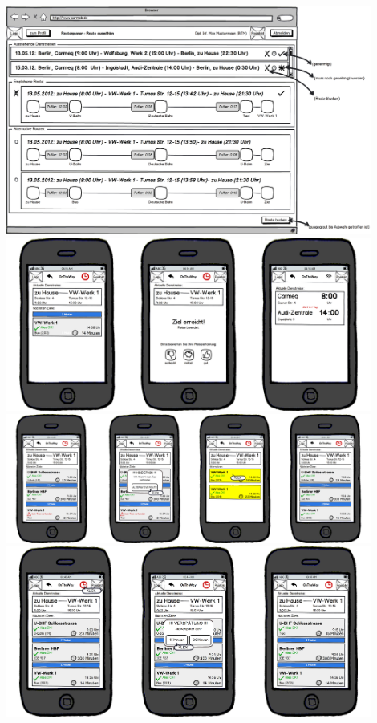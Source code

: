 \documentclass[12pt,a4paper]{article}
\begin{document}
\begin{center}
\includegraphics[width=12cm]{08_konvergenter_paperprototyp01_006.png}\\
\includegraphics[width=12cm]{08_konvergenter_paperprototyp01_007.png}\\
\includegraphics[width=12cm]{08_konvergenter_paperprototyp01_008.png}\\
\includegraphics[width=12cm]{08_konvergenter_paperprototyp01_009.png}\\

\end{center}
\end{document}
